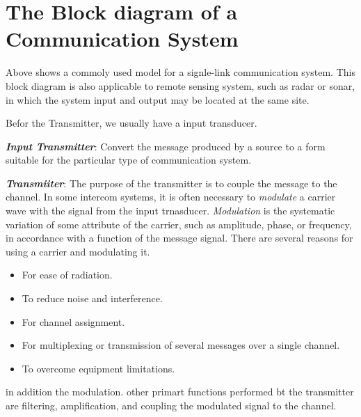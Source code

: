 \documentclass[12pt,a4paper]{book}
\begin{document}
\section{The Block diagram of a Communication System}
Above shows a commoly used model for a signle-link communication system. This block diagram is also applicable to remote sensing system, such as radar or sonar, in which the system input and output may be located at the same site.

Befor the Transmitter, we usually have a input transducer.

\textbf{\textit{Input Transmitter}}: Convert the message produced by a source to a form suitable for the particular type of communication system.

\textbf{\textit{Transmiiter}}: The purpose of the transmitter is to couple the message to the channel. In some intercom systems, it is often necessary to \textit{modulate} a carrier wave with the signal from the input trnasducer. \textit{Modulation} is the systematic variation of some attribute of the carrier, such as amplitude, phase, or frequency, in accordance with a function of the message signal. There are several reasons for using a carrier and modulating it.
\begin{itemize}
  \item For ease of radiation.
  \item To reduce noise and interference.
  \item For channel assignment.
  \item For multiplexing or transmission of several messages over a single channel.
  \item To overcome equipment limitations.
\end{itemize}
in addition the modulation. other primart functions performed bt the transmitter are filtering, amplification, and coupling the modulated signal to the channel.
\end{document}
